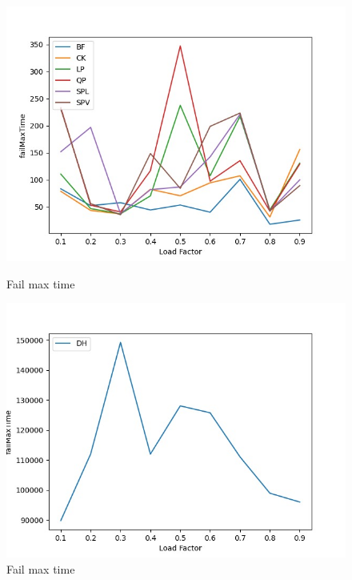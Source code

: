 \documentclass{article}
\begin{document}
    \begin{figure}[H]
          \includegraphics[width=\linewidth]{images/loadFactor_vs_failMaxTime.jpeg}
          \caption{Fail max time}\label{fig:plot2}
        \endminipage\hfill
          \includegraphics[width=\linewidth]{images/loadFactor_vs_failMaxTimeDH.jpeg}
          \caption{Fail max time}\label{fig:plot3}
        \endminipage
        \end{figure}
        
\end{document}
